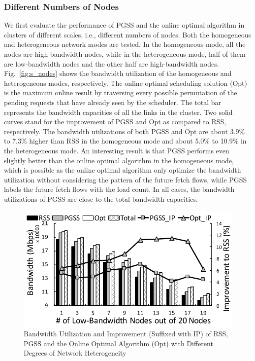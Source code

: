 \documentclass[10pt,journal,compsoc]{IEEEtran}
\begin{document}
\subsubsection{Different Numbers of Nodes}\label{section:differentNodeNumber}
We first evaluate the performance of PGSS and the online optimal algorithm in clusters of
different scales, i.e., different numbers of nodes.
Both the homogeneous and heterogeneous network modes are tested. 
In the homogeneous mode, all the nodes are high-bandwidth nodes, 
while in the heterogeneous mode, half of them are low-bandwidth nodes
and the other half are high-bandwidth nodes.
Fig.~\ref{fig:s_nodes} shows the bandwidth utilization of the homogeneous and
heterogeneous modes,
respectively. 
The online optimal scheduling solution (Opt) is the maximum online result by traversing every possible permutation of the pending requests that have already seen by the scheduler. 
The total bar represents the bandwidth capacities of all the links in the cluster. Two solid curves stand for the improvement of PGSS and Opt as compared to RSS, respectively.
The bandwidth utilizations of both PGSS and Opt 
are about 3.9\% to 7.3\% higher than RSS in the homogeneous mode
and about 5.0\% to 10.9\% in the heterogeneous mode. 
An interesting result is that PGSS performs even slightly better than the online optimal algorithm in the homogeneous mode, which is possible as the online optimal algorithm only optimize the bandwidth utilization without considering the pattern of the future fetch flows, while PGSS labels the future fetch flows with the load count. 
In all cases, the bandwidth utilizations of PGSS are close to the total bandwidth capacities.

\begin{figure}[!t]
\centering

\includegraphics[width=1\columnwidth,height=0.5\columnwidth]{figure14}

\caption{Bandwidth Utilization and Improvement (Suffixed with   IP) of RSS, PGSS and the Online Optimal Algorithm (Opt) with Different Degrees of Network Heterogeneity}
\label{fig:s_lowbandwidth}
\end{figure}
\end{document}
